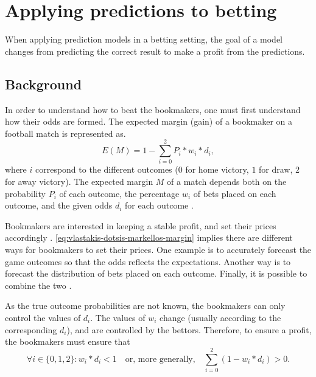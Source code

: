 \section{Applying predictions to betting}
\label{sec:background-betting}

When applying prediction models in a betting setting, the goal of a model changes from predicting the correct result to make a profit from the predictions.

\subsection{Background}

In order to understand how to beat the bookmakers, one must first understand how their odds are formed. The expected margin (gain) of a bookmaker on a football match is represented as.
\begin{equation}
    E(M) = 1 - \sum_{i=0}^{2} P_{i} * w_{i} * d_{i},
    \label{eq:vlastakis-dotsis-markellos-margin}
\end{equation}
where $i$ correspond to the different outcomes ($0$ for home victory, $1$ for draw, $2$ for away victory). The expected margin $M$ of a match depends both on the probability $P_{i}$ of each outcome, the percentage $w_{i}$ of bets placed on each outcome, and the given odds $d_{i}$ for each outcome \citep{bib:vlastakis-dotsis-markellos-2009}.

Bookmakers are interested in keeping a stable profit, and set their prices accordingly \citep{bib:vlastakis-dotsis-markellos-2009}. \cref{eq:vlastakis-dotsis-markellos-margin} implies there are different ways for bookmakers to set their prices. One example is to accurately forecast the game outcomes so that the odds reflects the expectations. Another way is to forecast the distribution of bets placed on each outcome. Finally, it is possible to combine the two \citep{bib:vlastakis-dotsis-markellos-2009}.

As the true outcome probabilities are not known, the bookmakers can only control the values of $d_{i}$. The values of $w_{i}$ change (usually according to the corresponding $d_{i}$), and are controlled by the bettors. Therefore, to ensure a profit, the bookmakers must ensure that
\begin{equation*}
    \forall i \in \{0, 1, 2\}: w_{i} * d_{i} < 1
    \quad \text{or, more generally,} \quad
    \sum_{i=0}^{2} (1 - w_{i} * d_{i}) > 0.
\end{equation*}


